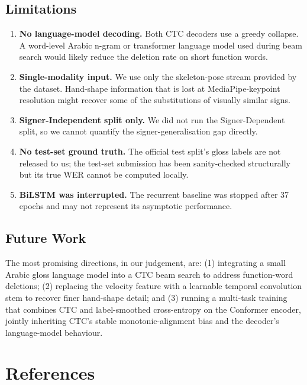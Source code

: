 \documentclass[11pt,a4paper]{article}
\begin{document}
\subsection{Limitations}
\begin{enumerate}
  \item \textbf{No language-model decoding.} Both CTC decoders use a greedy collapse. A word-level Arabic n-gram or transformer language model used during beam search would likely reduce the deletion rate on short function words.
  \item \textbf{Single-modality input.} We use only the skeleton-pose stream provided by the dataset. Hand-shape information that is lost at MediaPipe-keypoint resolution might recover some of the substitutions of visually similar signs.
  \item \textbf{Signer-Independent split only.} We did not run the Signer-Dependent split, so we cannot quantify the signer-generalisation gap directly.
  \item \textbf{No test-set ground truth.} The official test split's gloss labels are not released to us; the test-set submission has been sanity-checked structurally but its true WER cannot be computed locally.
  \item \textbf{BiLSTM was interrupted.} The recurrent baseline was stopped after 37 epochs and may not represent its asymptotic performance.
\end{enumerate}

\subsection{Future Work}
The most promising directions, in our judgement, are: (1) integrating a small Arabic gloss language model into a CTC beam search to address function-word deletions; (2) replacing the velocity feature with a learnable temporal convolution stem to recover finer hand-shape detail; and (3) running a multi-task training that combines CTC and label-smoothed cross-entropy on the Conformer encoder, jointly inheriting CTC's stable monotonic-alignment bias and the decoder's language-model behaviour.

\section*{References}
\end{document}
